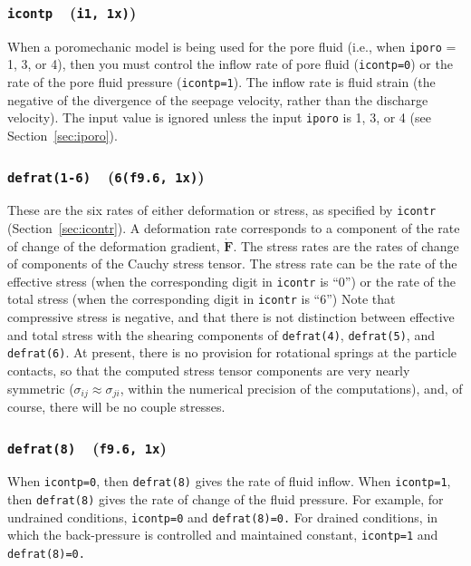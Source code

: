 \documentclass[letterpaper,11pt]{article}
\newcommand{\Var}[2]{\texttt{#1}\ \  (\texttt{#2})}
\begin{document}
\subsubsection[\texttt{icontp}]{\Var{icontp}{i1, 1x)}}\label{sec:icontp}
When a poromechanic model is being used for the pore fluid
(i.e., when \texttt{iporo} = 1, 3, or 4),
then you must control the inflow rate of pore fluid
(\texttt{icontp=0}) or the rate of the pore fluid pressure
(\texttt{icontp=1}).
The inflow rate is fluid strain (the negative of the
divergence of the seepage velocity, rather than the discharge velocity).
The input value is ignored unless the input
\texttt{iporo} is 1, 3, or 4 (see Section~\ref{sec:iporo}).
%
\subsubsection[\texttt{defrat(1-6)}]{\Var{defrat(1-6)}{6(f9.6, 1x)}}\label{sec:defrat}
These are the six rates of either deformation or stress,
as specified by \texttt{icontr} (Section~\ref{sec:icontr}).
A deformation rate corresponds to a component of the rate of change of
the deformation gradient, $\dot{\mathbf{F}}$.
The stress rates are the rates of change of components of the
Cauchy stress tensor.
The stress rate can be the rate of the effective
stress
(when the corresponding digit in \texttt{icontr} is ``0'')
or the rate of the total stress
(when the corresponding digit in \texttt{icontr} is ``6'')
Note that compressive stress is negative, and that there
is not distinction between effective and total stress with
the shearing components of \texttt{defrat(4)},
\texttt{defrat(5)}, and \texttt{defrat(6)}.
At present, there is no provision for rotational springs at the particle
contacts, so that the computed stress tensor components are very nearly
symmetric ($\sigma_{ij}\approx\sigma_{ji}$, within
the numerical precision of the computations), and, of course,
there will be no couple stresses.
%
\subsubsection[\texttt{defrat(8)}]{\Var{defrat(8)}{f9.6, 1x}}\label{sec:defrat8}
When \texttt{icontp=0}, then \texttt{defrat(8)} gives the
rate of fluid inflow.
When \texttt{icontp=1}, then \texttt{defrat(8)} gives the
rate of change of the fluid pressure.
For example,
for undrained conditions, \texttt{icontp=0} and 
\texttt{defrat(8)=0.}
For drained conditions, in which the back-pressure
is controlled and maintained constant,
\texttt{icontp=1} and 
\texttt{defrat(8)=0.}
%
\end{document}
